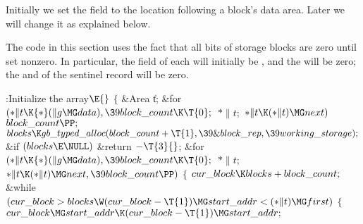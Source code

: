 Initially we set the  field to the location following a
block's data area. Later we will change it as explained below.

The code in this section uses the fact that all bits of storage blocks
are zero until set nonzero. In particular, the  field of each
 will initially be , and the  will
be zero;
the  and  of the sentinel record will be
zero.

\Y\B\4:Initialize the  array\X${}\E{}$\6
${}\{{}$\5
\1\&{Area} \|t;\7
\&{for} ${}({*}\|t\K{*}(\|g\MG\\{data}),\39\\{block\_count}\K\T{0};{}$ ${}{*}%
\|t;{}$ ${}{*}\|t\K({*}\|t)\MG\\{next}){}$\1\5
${}\\{block\_count}\PP;{}$\2\6
${}\\{blocks}\K\\{gb\_typed\_alloc}(\\{block\_count}+\T{1},\39\&{block\_rep},%
\39\\{working\_storage});{}$\6
\&{if} ${}(\\{blocks}\E\NULL){}$\1\5
\&{return} ${}{-}\T{3}{}$;\2\6
\&{for} ${}({*}\|t\K{*}(\|g\MG\\{data}),\39\\{block\_count}\K\T{0};{}$ ${}{*}%
\|t;{}$ ${}{*}\|t\K({*}\|t)\MG\\{next},\39\\{block\_count}\PP){}$\5
${}\{{}$\1\6
${}\\{cur\_block}\K\\{blocks}+\\{block\_count};{}$\6
\&{while} ${}(\\{cur\_block}>\\{blocks}\W(\\{cur\_block}-\T{1})\MG\\{start%
\_addr}<({*}\|t)\MG\\{first}){}$\5
${}\{{}$\1\6
${}\\{cur\_block}\MG\\{start\_addr}\K(\\{cur\_block}-\T{1})\MG\\{start%
\_addr};{}$\6
